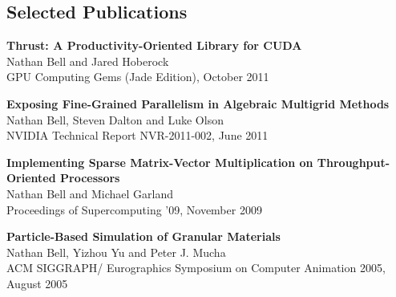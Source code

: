 \documentclass[margin,line]{res}
\begin{document}
\begin{resume}
\section{\sc Selected Publications}
{\bf Thrust: A Productivity-Oriented Library for CUDA} \\
Nathan Bell and Jared Hoberock \\
GPU Computing Gems (Jade Edition), October 2011

\vspace{-.15cm}
{\bf Exposing Fine-Grained Parallelism in Algebraic Multigrid Methods} \\
Nathan Bell, Steven Dalton and Luke Olson \\
NVIDIA Technical Report NVR-2011-002, June 2011

\vspace{-.15cm}
{\bf Implementing Sparse Matrix-Vector Multiplication on Throughput-Oriented Processors} \\
Nathan Bell and Michael Garland \\
Proceedings of Supercomputing '09, November 2009

\vspace{-.15cm}
{\bf Particle-Based Simulation of Granular Materials} \\
Nathan Bell, Yizhou Yu and Peter J. Mucha \\
ACM SIGGRAPH/ Eurographics Symposium on Computer Animation 2005, August 2005

\end{resume}
\end{document}
